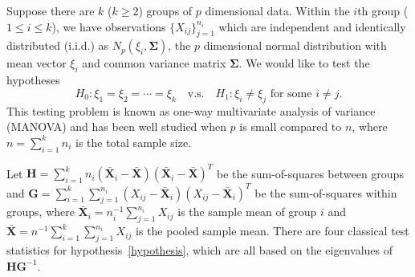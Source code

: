 \documentclass[12pt]{article} %
\renewcommand{\theequation}{\thesection\arabic{equation}}
\DeclareMathOperator{\mytr}{tr}
\newcommand{\bX}{\mathbf{X}}
\newcommand{\bH}{\mathbf{H}}
\newcommand{\bG}{\mathbf{G}}
\newcommand{\bfsym}[1]{\ensuremath{\boldsymbol{#1}}}
\def\bSigma {\bfsym {\Sigma}}
\theoremstyle{definition}
\begin{document}
\def\thefigure{\arabic{figure}}
\def\thetable{\arabic{table}}

\renewcommand{\theequation}{\thesection.\arabic{equation}}


\fontsize{12}{14pt plus.8pt minus .6pt}\selectfont

\setcounter{section}{1} %
\setcounter{equation}{0} %
Suppose there are $k$ ($k\geq 2$) groups of $p$ dimensional data.
Within the $i$th group ($1\leq i\leq k$), we have observations $\{X_{ij}\}_{j=1}^{n_i}$ which are independent and identically distributed (i.i.d.) as $N_p(\xi_i,\bSigma)$, the $p$ dimensional normal distribution with mean vector $\xi_i$ and common variance matrix $\bSigma$.
We would like to test the hypotheses
\begin{equation}\label{hypothesis}
    H_0: \xi_1=\xi_2=\cdots=\xi_k\quad \text{v.s.}\quad　H_1: \text{$\xi_i\neq \xi_j$ for some $i\neq j$}.
\end{equation}
This testing problem is known as one-way multivariate analysis of variance (MANOVA) and has been well studied when $p$ is small compared to $n$, where $n=\sum_{i=1}^k n_i$ is the total sample size.

Let $\bH=\sum_{i=1}^k n_i (\bar{\bX}_i-\bar{\bX})(\bar{\bX}_i-\bar{\bX})^T$ be the sum-of-squares between groups and $\bG=\sum_{i=1}^k \sum_{j=1}^{n_i}(X_{ij}-\bar{\bX}_i)(X_{ij}-\bar{\bX}_i)^T$ be the sum-of-squares within groups, where $\bar{\bX}_i=n_i^{-1}\sum_{j=1}^{n_i}X_{ij}$ is the sample mean of group $i$ and $\bar{\bX}=n^{-1}\sum_{i=1}^k\sum_{j=1}^{n_i}X_{ij}$ is the pooled sample mean.
   There are four classical test statistics for hypothesis~\eqref{hypothesis}, which are all based on the eigenvalues of $\bH\bG^{-1}$. 

\end{document}
